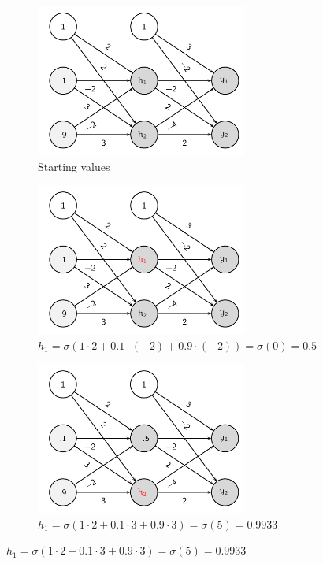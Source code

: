 \documentclass[11pt]{article}
\begin{document}
\begin{figure}[tbh!]
    \centering
    \begin{subfigure}{0.45\linewidth}
        \centering
        \includegraphics[keepaspectratio, height=5cm]{Pictures/multilayer_feedforward_example_01}
        \caption{Starting values}
    \end{subfigure}
    \begin{subfigure}{0.45\linewidth}
        \centering
        \includegraphics[keepaspectratio, height=5cm]{Pictures/multilayer_feedforward_example_02}
        \caption{$h_1 = \sigma\left( 1\cdot 2 + 0.1 \cdot (-2) + 0.9 \cdot (-2) \right) = \sigma(0) = 0.5$}
    \end{subfigure}
    \begin{subfigure}{0.45\linewidth}
        \centering
        \includegraphics[keepaspectratio, height=5cm]{Pictures/multilayer_feedforward_example_03}
        \caption{$h_1 = \sigma\left( 1\cdot 2 + 0.1 \cdot 3 + 0.9 \cdot 3 \right) = \sigma(5) = 0.9933$}
    \end{subfigure}

\end{figure}
\end{document}
